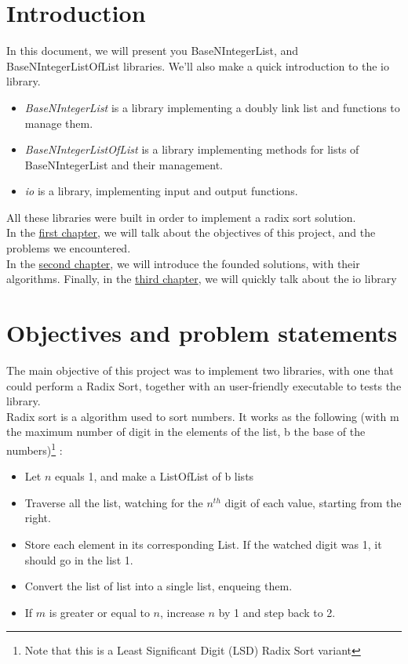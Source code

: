 \documentclass[book, backcover, english, nodocumentinfo]{upmethodology-document}
\begin{document}
\chapter*{Introduction}
In this document, we will present you BaseNIntegerList, and BaseNIntegerListOfList libraries. We'll also make a quick introduction to the io library.\\
\begin{itemize}
	\item{}   \textit{BaseNIntegerList} is a library implementing a doubly link list and functions to manage them.\\
	\item{}   \textit{BaseNIntegerListOfList} is a library implementing methods for lists of BaseNIntegerList and their management.\\
	\item{}   \textit{io} is a library, implementing input and output functions.\\
\end{itemize}

All these libraries were built in order to implement a radix sort solution.\\

In the \hyperref[chapter:Objectives]{first chapter}, we will talk about the objectives of this project, and the problems we encountered.\\
In the \hyperref[chapter:Algorithms]{second chapter}, we will introduce the founded solutions, with their algorithms.
Finally, in the \hyperref[chapter:IO-Lib]{third chapter}, we will quickly talk about  the io library

\tableofcontents{}

\chapter{Objectives and problem statements} \label{chapter:Objectives}
The main objective of this project was to implement two libraries, with one that could perform a Radix Sort, together with an user-friendly executable to tests the library.\\
Radix sort is a algorithm used to sort numbers. It works as the following (with m the maximum number of digit in the elements of the list, b the base of the numbers)\footnote{Note that this is a Least Significant Digit (LSD) Radix Sort variant} :\\
\begin{itemize}
	\item[1]{} Let $n$ equals 1, and make a ListOfList of b lists
	\item[2]{} Traverse all the list, watching for the $n^{th}$ digit of each value, starting from the right.
	\item[3]{} Store each element in its corresponding List. If the watched digit was 1, it should go in the  list 1.
	\item[4]{} Convert the list of list into a single list, enqueing them.
	\item[5]{} If $m$ is greater or equal to $n$, increase $n$ by 1 and step back to 2.
\end{itemize}
\end{document}
